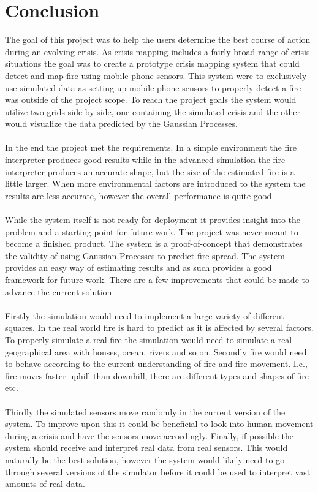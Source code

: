 \chapter{Conclusion}

The goal of this project was to help the users determine the best course of action during an evolving crisis. As crisis mapping includes a fairly broad range of crisis situations the goal was to create a prototype crisis mapping system that could detect and map fire using mobile phone sensors. This system were to exclusively use simulated data as setting up mobile phone sensors to properly detect a fire was outside of the project scope. To reach the project goals the system would utilize two grids side by side, one containing the simulated crisis and the other would visualize the data predicted by the Gaussian Processes.
\\\\
In the end the project met the requirements. In a simple environment the fire interpreter produces good results while in the advanced simulation the fire interpreter produces an accurate shape, but the size of the estimated fire is a little larger. When more environmental factors are introduced to the system the results are less accurate, however the overall performance is quite good.
\\\\
While the system itself is not ready for deployment it provides insight into the problem and a starting point for future work. The project was never meant to become a finished product. The system is a  proof-of-concept that demonstrates the validity of using Gaussian Processes to predict fire spread. The system provides an easy way of estimating results and as such provides a good framework for future work. There are a few improvements that could be made to advance the current solution.
\\\\
Firstly the simulation would need to implement a large variety of different squares. In the real world fire is hard to predict as it is affected by several factors. To properly simulate a real fire the simulation would need to simulate a real geographical area with houses, ocean, rivers and so on. Secondly fire would need to behave according to the current understanding of fire and fire movement. I.e., fire moves faster uphill than downhill, there are different types and shapes of fire etc.
\\\\
Thirdly the simulated sensors move randomly in the current version of the system. To improve upon this it could be beneficial to look into human movement during a crisis and have the sensors move accordingly. Finally, if possible the system should receive and interpret real data from real sensors. This would naturally be the best solution, however the system would likely need to go through several versions of the simulator before it could be used to interpret vast amounts of real data.